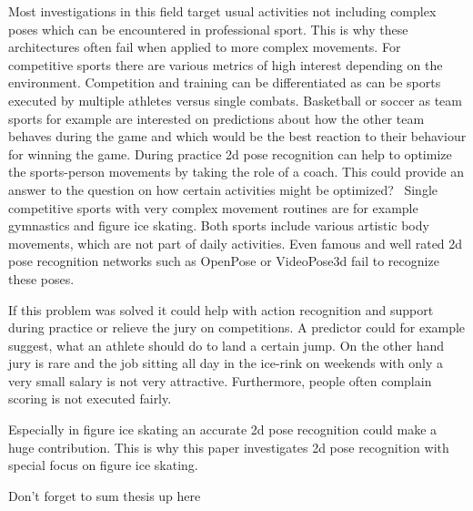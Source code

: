 \begin{flushleft}
    Most investigations in this field target usual activities not including complex poses which can be encountered in
    professional sport.
    This is why these architectures often fail when applied to more complex movements.
    For competitive sports there are various metrics of high interest depending on the environment.
    Competition and training can be differentiated as can be sports executed by multiple athletes versus single combats.
    Basketball or soccer as team sports for example are interested on predictions about
    how the other team behaves during the game and which would be the best reaction to their behaviour for winning
    the game.
    During practice 2d pose recognition can help to optimize the sports-person movements by taking the role of a coach.
    This could provide an answer to the question on how certain activities might be optimized? \
Single competitive sports with very complex movement routines are for example gymnastics and figure ice skating.
    Both sports include various artistic body movements, which are not part of daily activities.
    Even famous and well rated 2d pose recognition networks such as OpenPose or VideoPose3d fail to recognize these
    poses.
\end{flushleft}
\begin{flushleft}
    If this problem was solved it could help with action recognition and support during practice or relieve the jury
    on competitions.
    A predictor could for example suggest, what an athlete should do to land a certain jump.
    On the other hand jury is rare and the job sitting all day in the ice-rink on weekends with only a very small
    salary is not very attractive.
    Furthermore, people often complain scoring is not executed fairly.
\end{flushleft}
\begin{flushleft}
    Especially in figure ice skating an accurate 2d pose recognition could make a huge contribution.
    This is why this paper investigates 2d pose recognition with special focus on figure ice skating.

    Don't forget to sum thesis up here

\end{flushleft}


